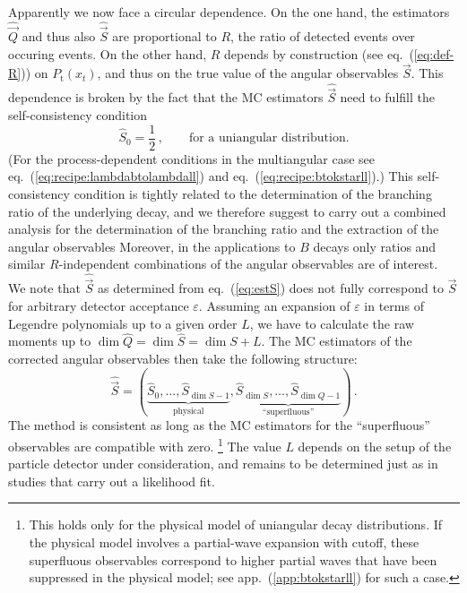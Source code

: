 \documentclass[aps,nofootinbib,preprintnumbers,prd,twocolumn]{revtex4-1}
\newcommand{\est}[1]{\widehat{#1}}
\newcommand{\refapp}[1]{app.~(\ref{app:#1})}
\newcommand{\refeq}[1]{eq.~(\ref{eq:#1})}
\let\eps\varepsilon
\newcommand{\vecest}[1]{\widehat{\vec{#1}}}
\begin{document}
Apparently we now face a circular dependence. On the one hand,
the estimators $\vecest{Q}$ and thus also $\vecest{S}$
are proportional to $R$, the ratio of detected events over occuring events.
On the other hand, $R$ depends by construction (see \refeq{def-R})
on $P_\text{t}(x_t)$, and thus on the true value of the angular observables $\vec{S}$.
This dependence is broken by the fact that the MC estimators $\vecest{S}$ need to fulfill
the self-consistency condition
\begin{equation}
    \est{S}_0 = \frac{1}{2}\,,\qquad\text{for a uniangular distribution}.
\end{equation}
(For the process-dependent conditions in the multiangular case see \refeq{recipe:lambdabtolambdall} and
\refeq{recipe:btokstarll}.)
This self-consistency condition is tightly related to the determination of
the branching ratio of the underlying decay, and we therefore suggest to
carry out a combined analysis for the determination of the branching ratio
and the extraction of the angular observables
Moreover, in the applications to $B$ decays only ratios and similar $R$-independent combinations
of the angular observables are of interest.
\\

We note that $\vecest{S}$ as determined from \refeq{estS} does not fully
correspond to $\vec{S}$ for arbitrary detector acceptance $\eps$.
Assuming an expansion of $\eps$ in terms of Le\-gendre polynomials up to a given
order $L$, we have to calculate the raw moments up to $\dim \est{Q} = \dim
\est{S} = \dim S + L$. The MC estimators of the corrected angular observables
then take the following structure:
\begin{equation}
    \vecest{S} = ( \underbrace{\est{S}_0, \dots, \est{S}_{\dim S - 1}}_\text{physical}, \underbrace{\est{S}_{\dim S}, \dots, \est{S}_{\dim Q - 1}}_\text{``superfluous''})\,.
\end{equation}
The method is consistent as long as the MC estimators for the ``superfluous''
observables are compatible with zero. \footnote{This holds only for the
    physical model of uniangular decay distributions. If the physical model
    involves a partial-wave expansion with cutoff, these superfluous
    observables correspond to higher partial waves that have been suppressed in
the physical model; see \refapp{btokstarll} for such a case.} The value $L$ depends
on the setup of the particle detector under consideration, and remains to
be determined just as in studies that carry out a likelihood fit.\\
\end{document}
